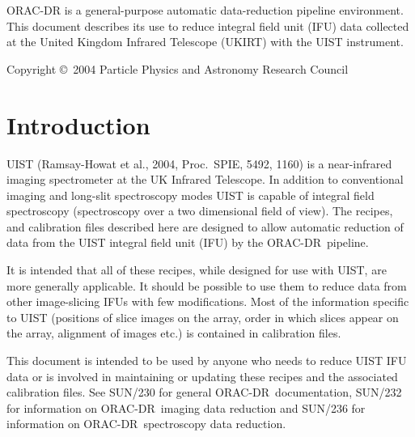 \documentclass[twoside,11pt]{article}
\newcommand{\stardocinitials}  {SUN}
\newcommand{\stardoccopyright} {Copyright \copyright\ 2004 Particle Physics and Astronomy Research Council}
\newcommand{\stardocnumber}    {246.2}
\newcommand{\stardocabstract}  {ORAC-DR is a
general-purpose automatic data-reduction pipeline environment.  This
document describes its use to reduce integral field unit (IFU) data
collected at the United Kingdom Infrared Telescope (UKIRT) with the
UIST instrument. }
\newcommand{\stardocname}{\stardocinitials /\stardocnumber}
\newenvironment{latexonly}{}{}
\newcommand{\xref}[3]{#1}
\renewcommand{\_}{\texttt{\symbol{95}}}
\newcommand{\ORACDR}{{\footnotesize ORAC-DR}}
\renewcommand{\thepage}{\roman{page}}
\begin{document}
\stardocabstract

\begin{latexonly}
\newpage
\vspace*{\fill}
\stardoccopyright
\end{latexonly}

  \newpage
  \begin{latexonly}
    \setlength{\parskip}{0mm}
    \tableofcontents
    \setlength{\parskip}{\medskipamount}
    \markboth{\stardocname}{\stardocname}
  \end{latexonly}

\cleardoublepage
\renewcommand{\thepage}{\arabic{page}}
\setcounter{page}{1}



\section{Introduction}

UIST (Ramsay-Howat et al., 2004, Proc.\ SPIE, 5492, 1160)
is a near-infrared imaging spectrometer at the UK Infrared
Telescope. In addition to conventional imaging and long-slit
spectroscopy modes UIST is capable of integral field spectroscopy
(spectroscopy over a two dimensional field of view). The recipes,
and calibration files described here are designed to allow
automatic reduction of data from the UIST integral field unit (IFU) by
the \ORACDR\ pipeline.

It is intended that all of these recipes, while designed for use with
UIST, are more generally applicable. It should be possible to use them
to reduce data from other image-slicing IFUs with few
modifications. Most of the information specific to UIST (positions of
slice images on the array, order in which slices appear on the array,
alignment of images etc.) is contained in calibration files.

This document is intended to be used by anyone who needs to reduce
UIST IFU data or is involved in maintaining or updating these recipes
and the associated calibration files. See \xref{SUN/230}{sun230}{} for
general \ORACDR\ documentation, \xref{SUN/232}{sun232}{} for
information on \ORACDR\ imaging data reduction and
\xref{SUN/236}{sun236}{} for information on \ORACDR\ spectroscopy data
reduction.
\end{document}
